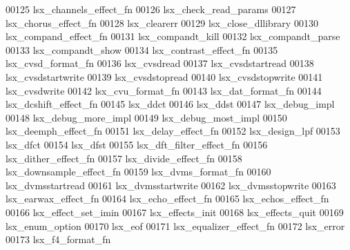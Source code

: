 \begin{DoxyCode}
00125 \textcolor{stringliteral}{lsx\_channels\_effect\_fn}
00126 \textcolor{stringliteral}{lsx\_check\_read\_params}
00127 \textcolor{stringliteral}{lsx\_chorus\_effect\_fn}
00128 \textcolor{stringliteral}{lsx\_clearerr}
00129 \textcolor{stringliteral}{lsx\_close\_dllibrary}
00130 \textcolor{stringliteral}{lsx\_compand\_effect\_fn}
00131 \textcolor{stringliteral}{lsx\_compandt\_kill}
00132 \textcolor{stringliteral}{lsx\_compandt\_parse}
00133 \textcolor{stringliteral}{lsx\_compandt\_show}
00134 \textcolor{stringliteral}{lsx\_contrast\_effect\_fn}
00135 \textcolor{stringliteral}{lsx\_cvsd\_format\_fn}
00136 \textcolor{stringliteral}{lsx\_cvsdread}
00137 \textcolor{stringliteral}{lsx\_cvsdstartread}
00138 \textcolor{stringliteral}{lsx\_cvsdstartwrite}
00139 \textcolor{stringliteral}{lsx\_cvsdstopread}
00140 \textcolor{stringliteral}{lsx\_cvsdstopwrite}
00141 \textcolor{stringliteral}{lsx\_cvsdwrite}
00142 \textcolor{stringliteral}{lsx\_cvu\_format\_fn}
00143 \textcolor{stringliteral}{lsx\_dat\_format\_fn}
00144 \textcolor{stringliteral}{lsx\_dcshift\_effect\_fn}
00145 \textcolor{stringliteral}{lsx\_ddct}
00146 \textcolor{stringliteral}{lsx\_ddst}
00147 \textcolor{stringliteral}{lsx\_debug\_impl}
00148 \textcolor{stringliteral}{lsx\_debug\_more\_impl}
00149 \textcolor{stringliteral}{lsx\_debug\_most\_impl}
00150 \textcolor{stringliteral}{lsx\_deemph\_effect\_fn}
00151 \textcolor{stringliteral}{lsx\_delay\_effect\_fn}
00152 \textcolor{stringliteral}{lsx\_design\_lpf}
00153 \textcolor{stringliteral}{lsx\_dfct}
00154 \textcolor{stringliteral}{lsx\_dfst}
00155 \textcolor{stringliteral}{lsx\_dft\_filter\_effect\_fn}
00156 \textcolor{stringliteral}{lsx\_dither\_effect\_fn}
00157 \textcolor{stringliteral}{lsx\_divide\_effect\_fn}
00158 \textcolor{stringliteral}{lsx\_downsample\_effect\_fn}
00159 \textcolor{stringliteral}{lsx\_dvms\_format\_fn}
00160 \textcolor{stringliteral}{lsx\_dvmsstartread}
00161 \textcolor{stringliteral}{lsx\_dvmsstartwrite}
00162 \textcolor{stringliteral}{lsx\_dvmsstopwrite}
00163 \textcolor{stringliteral}{lsx\_earwax\_effect\_fn}
00164 \textcolor{stringliteral}{lsx\_echo\_effect\_fn}
00165 \textcolor{stringliteral}{lsx\_echos\_effect\_fn}
00166 \textcolor{stringliteral}{lsx\_effect\_set\_imin}
00167 \textcolor{stringliteral}{lsx\_effects\_init}
00168 \textcolor{stringliteral}{lsx\_effects\_quit}
00169 \textcolor{stringliteral}{lsx\_enum\_option}
00170 \textcolor{stringliteral}{lsx\_eof}
00171 \textcolor{stringliteral}{lsx\_equalizer\_effect\_fn}
00172 \textcolor{stringliteral}{lsx\_error}
00173 \textcolor{stringliteral}{lsx\_f4\_format\_fn}

\end{DoxyCode}
